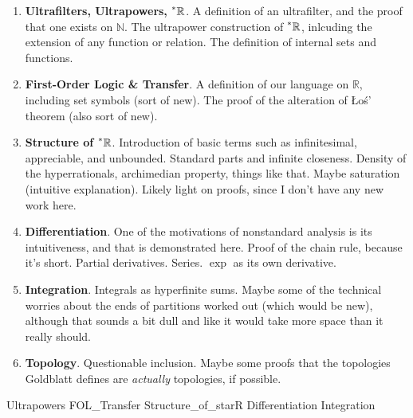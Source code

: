 \documentclass{article}
\newcommand{\reals}{\mathbb{R}}
\newcommand{\hreals}{\prescript{*}{}{\mathbb{R}}}
\newcommand{\nats}{\mathbb{N}}
\theoremstyle{definition}
\begin{document}
\begin{enumerate}
    \item \textbf{Ultrafilters, Ultrapowers, $\hreals$}. A definition of an ultrafilter, and the proof that one exists on $\nats$. The ultrapower construction of $\hreals$, inlcuding the extension of any function or relation. The definition of internal sets and functions.
    \item \textbf{First-Order Logic \& Transfer}. A definition of our language on $\reals$, including set symbols (sort of new). The proof of the alteration of \L o\'s' theorem (also sort of new).
    \item \textbf{Structure of $\hreals$}. Introduction of basic terms such as infinitesimal, appreciable, and unbounded. Standard parts and infinite closeness. Density of the hyperrationals, archimedian property, things like that. Maybe saturation (intuitive explanation). Likely light on proofs, since I don't have any new work here.
    \item \textbf{Differentiation}. One of the motivations of nonstandard analysis is its intuitiveness, and that is demonstrated here. Proof of the chain rule, because it's short. Partial derivatives. Series. $\exp$ as its own derivative.
    \item \textbf{Integration}. Integrals as hyperfinite sums. Maybe some of the technical worries about the ends of partitions worked out (which would be new), although that sounds a bit dull and like it would take more space than it really should. 
    \item \textbf{Topology}. Questionable inclusion. Maybe some proofs that the topologies Goldblatt defines are \textit{actually} topologies, if possible.
\end{enumerate}

{Ultrapowers}
{FOL_Transfer}
{Structure_of_starR}
{Differentiation}
{Integration}

\nocite{*}
\printbibliography
\end{document}

